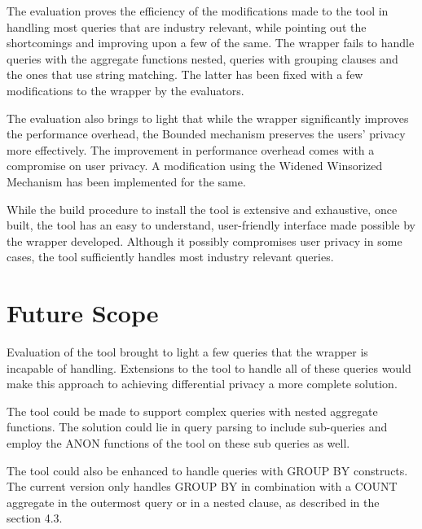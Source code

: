 \documentclass[acmsmall]{acmart}
\begin{document}
The evaluation proves the efficiency of the modifications made to the tool in handling most queries that are industry relevant, while pointing out the shortcomings and improving upon a few of the same. The wrapper fails to handle queries with the aggregate functions nested, queries with grouping clauses and the ones that use string matching. The latter has been fixed with a few modifications to the wrapper by the evaluators.

The evaluation also brings to light that while the wrapper significantly improves the performance overhead, the Bounded mechanism preserves the users’ privacy more effectively. The improvement in performance overhead comes with a compromise on user privacy. A modification using the Widened Winsorized Mechanism has been implemented for the same.

While the build procedure to install the tool is extensive and exhaustive, once built, the tool has an easy to understand, user-friendly interface made possible by the wrapper developed. Although it possibly compromises user privacy in some cases, the tool sufficiently handles most industry relevant queries.

\section{Future Scope}\label{6}
Evaluation of the tool brought to light a few queries that the wrapper is incapable of handling. Extensions to the tool to handle all of these queries would make this approach to achieving differential privacy a more complete solution.

The tool could be made to support complex queries with nested aggregate functions. The solution could lie in query parsing to include sub-queries and employ the ANON functions of the tool on these sub queries as well.

The tool could also be enhanced to handle queries with GROUP BY constructs. The current version only handles GROUP BY in combination with a COUNT aggregate in the outermost query or in a nested clause, as described in the section 4.3.
\end{document}
